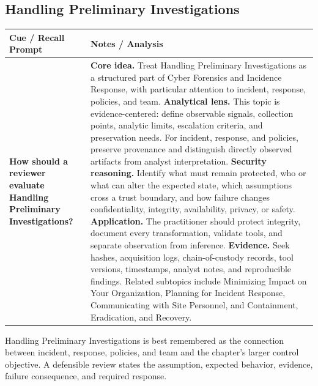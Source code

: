 \documentclass[11pt]{article}
\newcommand{\CornellHeader}{%
\rowcolor{Navy}\color{white}\bfseries Cue / Recall Prompt & \color{white}\bfseries Notes / Analysis\\\hline}
\newcommand{\CornellRow}[2]{%
\cellcolor{CueGray}\RaggedRight\textbf{#1} & \RaggedRight #2\\\hline}
\begin{document}
\subsection*{Handling Preliminary Investigations}
\begin{longtable}{>{\RaggedRight\arraybackslash}p{}|>{\RaggedRight\arraybackslash}p{}}
\CornellHeader
\CornellRow{How should a reviewer evaluate Handling Preliminary Investigations?}{\textbf{Core idea.} Treat Handling Preliminary Investigations as a structured part of Cyber Forensics and Incidence Response, with particular attention to incident, response, policies, and team. \textbf{Analytical lens.} This topic is evidence-centered: define observable signals, collection points, analytic limits, escalation criteria, and preservation needs. For incident, response, and policies, preserve provenance and distinguish directly observed artifacts from analyst interpretation. \textbf{Security reasoning.} Identify what must remain protected, who or what can alter the expected state, which assumptions cross a trust boundary, and how failure changes confidentiality, integrity, availability, privacy, or safety. \textbf{Application.} The practitioner should protect integrity, document every transformation, validate tools, and separate observation from inference. \textbf{Evidence.} Seek hashes, acquisition logs, chain-of-custody records, tool versions, timestamps, analyst notes, and reproducible findings. Related subtopics include Minimizing Impact on Your Organization, Planning for Incident Response, Communicating with Site Personnel, and Containment, Eradication, and Recovery.}
\end{longtable}
\begin{topicsummary}
Handling Preliminary Investigations is best remembered as the connection between incident, response, policies, and team and the chapter's larger control objective. A defensible review states the assumption, expected behavior, evidence, failure consequence, and required response.
\end{topicsummary}
\end{document}
